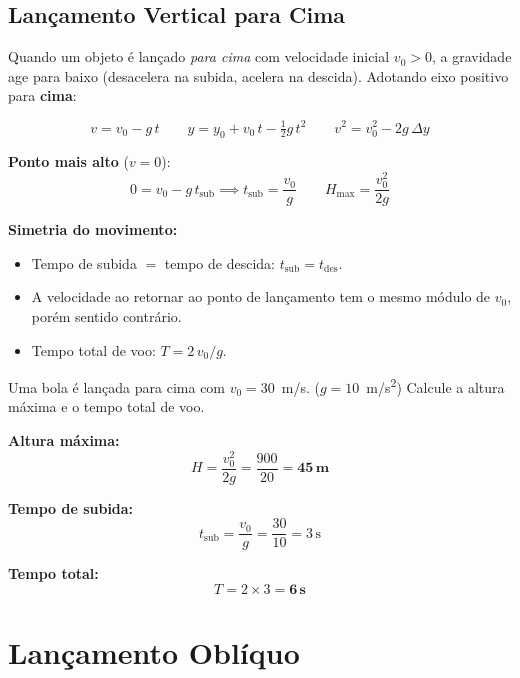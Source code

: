 \documentclass[12pt,a4paper]{article}
\begin{document}
\subsection{Lan\c{c}amento Vertical para Cima}

Quando um objeto \'e lan\c{c}ado \emph{para cima} com velocidade inicial
$v_0 > 0$, a gravidade age para baixo (desacelera na subida, acelera na
descida). Adotando eixo positivo para \textbf{cima}:

\begin{tcolorbox}[formulabox={Lan\c{c}amento Vertical para Cima}]
  \[
    v = v_0 - g\,t \qquad y = y_0 + v_0\,t - \tfrac{1}{2}g\,t^2
    \qquad v^2 = v_0^2 - 2g\,\Delta y
  \]
\end{tcolorbox}

\textbf{Ponto mais alto} ($v = 0$):
\[
  0 = v_0 - g\,t_{\text{sub}} \implies
  \boxed{t_{\text{sub}} = \frac{v_0}{g}} \qquad
  \boxed{H_{\max} = \frac{v_0^2}{2g}}
\]

\textbf{Simetria do movimento:}
\begin{itemize}
  \item Tempo de subida $=$ tempo de descida: $t_{\text{sub}} = t_{\text{des}}$.
  \item A velocidade ao retornar ao ponto de lan\c{c}amento tem o mesmo
        m\'odulo de $v_0$, por\'em sentido contr\'ario.
  \item Tempo total de voo: $T = 2\,v_0/g$.
\end{itemize}

\begin{tcolorbox}[exemplobox={Exemplo 6 --- Lan\c{c}amento vertical}]
  Uma bola \'e lan\c{c}ada para cima com $v_0 = 30$~m/s. ($g = 10$~m/s\textsuperscript{2})
  Calcule a altura m\'axima e o tempo total de voo.

  \medskip
  \textbf{Altura m\'axima:}
  \[
    H = \frac{v_0^2}{2g} = \frac{900}{20} = \mathbf{45\,\text{m}}
  \]

  \textbf{Tempo de subida:}
  \[
    t_{\text{sub}} = \frac{v_0}{g} = \frac{30}{10} = 3\,\text{s}
  \]

  \textbf{Tempo total:}
  \[
    T = 2 \times 3 = \mathbf{6\,\text{s}}
  \]
\end{tcolorbox}


\section{Lan\c{c}amento Obl\'iquo}
\end{document}
